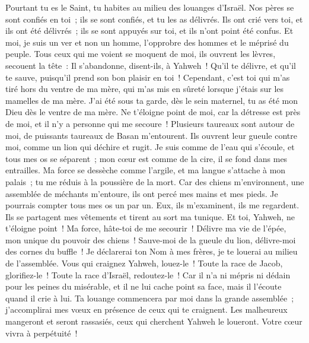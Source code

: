 \begin{multicols}{2}
Pourtant tu es le Saint, tu habites au milieu des louanges d'Israël.
Nos pères se sont confiés en toi~; ils se sont confiés, et tu les as délivrés.
Ils ont crié vers toi, et ils ont été délivrés~; ils se sont appuyés sur toi, et ils n'ont point été confus.
Et moi, je suis un ver et non un homme, l'opprobre des hommes et le méprisé du peuple.
Tous ceux qui me voient se moquent de moi, ils ouvrent les lèvres, secouent la tête~:
Il s'abandonne, disent-ils, à Yahweh~! Qu'il te délivre, et qu'il te sauve, puisqu'il prend son bon plaisir en toi~!
Cependant, c'est toi qui m'as tiré hors du ventre de ma mère, qui m'as mis en sûreté lorsque j'étais sur les mamelles de ma mère.
J'ai été sous ta garde, dès le sein maternel, tu as été mon Dieu dès le ventre de ma mère.
Ne t'éloigne point de moi, car la détresse est près de moi, et il n'y a personne qui me secoure~!
Plusieurs taureaux sont autour de moi, de puissants taureaux de Basan m'entourent.
Ils ouvrent leur gueule contre moi, comme un lion qui déchire et rugit.
Je suis comme de l'eau qui s'écoule, et tous mes os se séparent~; mon cœur est comme de la cire, il se fond dans mes entrailles.
Ma force se dessèche comme l'argile, et ma langue s'attache à mon palais~; tu me réduis à la poussière de la mort.
Car des chiens m'environnent, une assemblée de méchants m'entoure, ils ont percé mes mains et mes pieds.
Je pourrais compter tous mes os un par un. Eux, ils m'examinent, ils me regardent.
Ils se partagent mes vêtements et tirent au sort ma tunique.
Et toi, Yahweh, ne t'éloigne point~! Ma force, hâte-toi de me secourir~!
Délivre ma vie de l'épée, mon unique du pouvoir des chiens~!
Sauve-moi de la gueule du lion, délivre-moi des cornes du buffle~!
Je déclarerai ton Nom à mes frères, je te louerai au milieu de l'assemblée.
Vous qui craignez Yahweh, louez-le~! Toute la race de Jacob, glorifiez-le~! Toute la race d'Israël, redoutez-le~!
Car il n'a ni mépris ni dédain pour les peines du misérable, et il ne lui cache point sa face, mais il l'écoute quand il crie à lui.
Ta louange commencera par moi dans la grande assemblée~; j'accomplirai mes vœux en présence de ceux qui te craignent.
Les malheureux mangeront et seront rassasiés, ceux qui cherchent Yahweh le loueront. Votre cœur vivra à perpétuité~!

\end{multicols}
